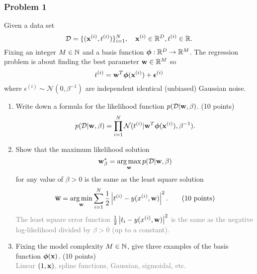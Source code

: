 \documentclass[12pt,a4paper]{article}
\newcommand{\gray}[1]{\textcolor{gray}{#1}}
\renewcommand{\v}[1]{\ifmmode\mathbf{#1}\fi}
\newcommand{\ra}[1]{\ifnum #1=1\rightarrow\fi\ifnum #1=2\Rightarrow\fi\ifnum #1=3\Rrightarrow\fi\ifnum #1=4\rightrightarrows\fi\ifnum #1=5\rightleftarrows\fi\ifnum #1=6\mapsto\fi\ifnum #1=7\iffalse\fi\fi\ifnum #1=8\twoheadrightarrow\fi\ifnum #1=9\rightharpoonup\fi\ifnum #1=0\rightharpoondown\fi}
\renewcommand{\l}{\left}
\renewcommand{\r}{\right}
\newcommand{\SUM}[2]{\sum\limits_{#1}^{#2}}
\DeclareMathOperator*{\argmin}{arg\,min}
\DeclareMathOperator*{\argmax}{arg\,max}
\def\R{\ifmmode\mathbb R\fi}
\def\N{\ifmmode\mathbb N\fi}
\newcommand{\solution}[1]{\gray{#1}}
\begin{document}
\subsubsection*{Problem 1}
Given a data set 
\begin{equation*}
\mathcal D = \{ (\v x^{(i)}, t^{(i)}) \}_{i=1}^N, \hskip10pt \v x^{(i)} \in \R^D, t^{(i)} \in \R.
\end{equation*}
Fixing an integer $M \in \N$ and a basis function $\boldsymbol\phi: \R^D \ra1 \R^M$. The regression problem is about finding the best parameter $\v w \in \R^M$ so
\begin{equation*}
t^{(i)} = \v w^T \boldsymbol\phi(\v x^{(i)}) + \boldsymbol \epsilon^{(i)}
\end{equation*}
where $\epsilon^{(i)} \sim \mathcal N(0, \beta^{-1})$ are independent identical (unbiased) Gaussian noise. 
%
\begin{enumerate}[label=(\alph*)]
%
\item Write down a formula for the likelihood function $p(\mathcal D \vert \v w, \beta)$. (10 points) 
\solution{
\begin{equation*}
p(\mathcal D \vert \v w, \beta) = \prod_{i=1}^N \mathcal N(t^{(i)} \vert \v w^T\boldsymbol\phi(\v x^{(i)}), \beta^{-1}).
\end{equation*}}
%
\item Show that the maximum likelihood solution 
\begin{equation*}
\v w^\ast_\beta = \argmax_{\v w} p(\mathcal D \vert \v w, \beta)
\end{equation*} for any value of $\beta > 0$ is the same as the least square solution 
\begin{equation*}
\overline {\v w} = \argmin_{\v w} \SUM{i=1}N \frac12 \l|t^{(i)} - y(x^{(i)}, \v w)\r|^2. \hskip20pt\text{(10 points)}
\end{equation*}
\solution{
The least square error function $\frac12 \l|t_i - y(x^{(i)}, \v w)\r|^2$ is the same as the negative log-likelihood divided by $\beta>0$ (up to a constant).}
%
\item Fixing the model complexity $M \in \N$, give three examples of the basis function $\boldsymbol\phi(\v x)$. (10 points)
\solution{\\Linear $(1, \v x)$, spline functions, Gaussian, sigmoidal, etc. }
\end{enumerate}


\newpage
\end{document}
